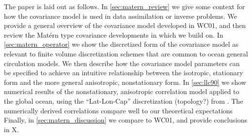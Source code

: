 The paper is laid out as follows.
In \cref{sec:matern_review} we give some context for how the covariance model is
used in data assimilation or inverse problems.
We provide a general overview of the covariance model developed in WC01, and
then review the Mat\'ern type covariance developments in \citet{RSSB:RSSB777}
which we build on.
In \cref{sec:matern_operator} we show the discretized form of the covariance model as
relevant to finite volume discretization schemes that are common to ocean
general circulation models.
We then describe how the covariance model parameters can be specified to achieve
an intuitive relationship between the isotropic, stationary form and the more
general anisotropic, nonstationary form.
In \cref{sec:llc90} we show numerical results of the nonstationary, anisotropic
correlation model applied to the global ocean, using the ``Lat-Lon-Cap''
discretization (topology?) from \citet{forgetECCOv4}.
The numerically derived correlations compare well to our theoretical
expectations
Finally, in \cref{sec:matern_discussion} we compare to WC01, and provide
conclusions in X.
